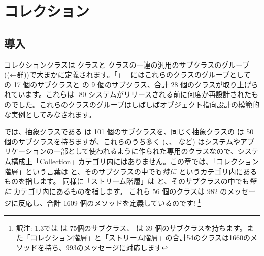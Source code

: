 \documentclass[a4paper,10pt,twoside]{book}
\begin{document}
	\sloppy
\fi
\chapter{コレクション}


\section{導入}

コレクションクラスは   クラスと  クラスの一連の汎用のサブクラスのグループ((←群))で大まかに定義されます。「」~\cite{Gold83a} にはこれらのクラスのグループとして  の 17 個のサブクラスと   の 9 個のサブクラス、合計 28 個のクラスが取り上げられています。これらは \st-80 システムがリリースされる前に何度か再設計されたものでした。これらのクラスのグループはしばしばオブジェクト指向設計の模範的な実例としてみなされます。

\pharo では、抽象クラスである は 101 個のサブクラスを、同じく抽象クラスの  は 50 個のサブクラスを持ちますが、これらのうち多く (\mbox{、}\mbox{、} など) はシステムやアプリケーションの一部として使われるように作られた専用のクラスなので、システム構成上「Collection」カテゴリ内にはありません。この章では、「コレクション階層」という言葉は  と、そのサブクラスの中でも\emph{特に}   というカテゴリ内にあるものを指します。
同様に「ストリーム階層」は  と、そのサブクラスの中でも\emph{特に}  カテゴリ内にあるものを指します。
これら 56 個のクラスは 982 のメッセージに反応し、合計 1609 個のメソッドを定義しているのです! \footnote{訳注: \pharo 1.3では は 75個のサブクラス、 は 39 個のサブクラスを持ちます。また「コレクション階層」と「ストリーム階層」の合計54のクラスは1660のメソッドを持ち、993のメッセージに対応します}
\end{document}
